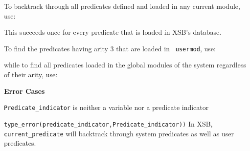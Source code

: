 \begin{description}
    To backtrack through all predicates defined and loaded in any current 
    module, use:


    This succeeds once for every predicate that is loaded in XSB's
    database.

    To find the predicates having arity 3 that are loaded in {\tt
    usermod}, use:


    while to find all predicates loaded in the global modules of the system
    regardless of their arity, use:

%
{\bf Error Cases}
\bi
\item 	{\tt Predicate\_indicator} is neither a variable nor a predicate indicator
\bi
\item 	{\tt type\_error(predicate\_indicator,Predicate\_indicator))}
\ei
\ei
%
\compatability
%
In XSB, {\tt current\_predicate} will backtrack through system
predicates as well as user predicates.



\end{description}
